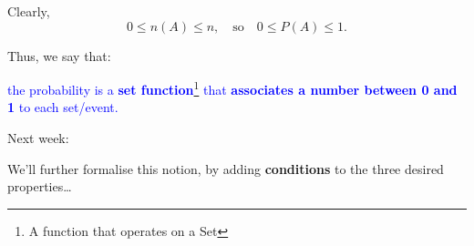 \documentclass[notes=show]{beamer}\usepackage[]{graphicx}\usepackage[]{color}
\newtheorem{remark}{Remark}[section]
\begin{document}
\begin{frame}{\secname}

Clearly,
$$0 \leq n(A) \leq n, \quad \text{so} \quad  0 \leq P(A) \leq 1.$$

Thus, we say that:

\begin{center}
\textcolor{blue}{the probability is a \textbf{set function}\footnote{A function that operates on a Set} that \textbf{associates a number between 0 and 1} to each set/event.}
\end{center}

\pause

Next week:

We'll further formalise this notion, by adding \textbf{conditions} to the three desired properties\dots
\end{frame}




\end{document}
